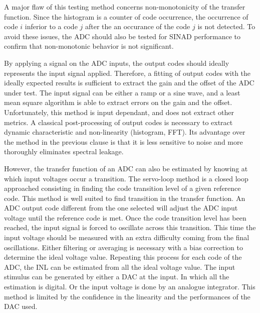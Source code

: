 A major flaw of this testing method concerns non-monotonicity of the transfer function. Since the histogram is a counter of code occurrence, the occurrence of code $i$ inferior to a code $j$ after the an occurance of the code $j$ is not detected. To avoid these issues, the ADC should also be tested for SINAD performance to confirm that non-monotonic behavior is not significant.

By applying a signal on the ADC inputs, the output codes should ideally represents the input signal applied. Therefore, a fitting of output codes with the ideally expected results is sufficient to extract the gain and the offset of the ADC under test. The input signal can be either a ramp or a sine wave, and a least mean square algorithm is able to extract errors on the gain and the offset.
Unfortunately, this method is input dependant, and does not extract other metrics. A classical post-processing of output codes is necessary to extract dynamic characteristic and non-linearity (histogram, FFT). Its advantage over the method in the previous clause is that it is less sensitive to noise and more thoroughly eliminates spectral leakage.

However, the transfer function of an ADC can also be estimated by knowing at which input voltages occur a transition. The servo-loop method is a closed loop approached consisting in finding the code transition level of a given reference code. This method is well suited to find transition in the transfer function.
An ADC output code different from the one selected will adjust the ADC input voltage until the reference code is met. Once the code transition level has been reached, the input signal is forced to oscillate across this transition.
This time the input voltage should be measured with an extra difficulty coming from the final oscillations. Either filtering or averaging is necessary with a bias correction to determine the ideal voltage value. Repeating this process for each code of the ADC, the INL can be estimated from all the ideal voltage value.
The input stimulus can be generated by either a DAC at the input. In which all the estimation is digital. Or the input voltage is done by an analogue integrator. This method is limited by the confidence in the linearity and the performances of the DAC used.

